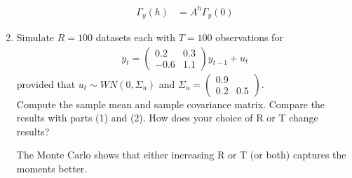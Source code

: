 \documentclass[a4paper]{scrartcl}
\begin{document}
\begin{enumerate}
\begin{solution}
\begin{align*}
                      \Gamma_y(h) & = A^h \Gamma_y(0)
                  \end{align*}
              \end{solution}
        \item Simulate $R=100$ datasets each with $T=100$ observations for
              \begin{align*}
                  y_t = \begin{pmatrix}0.2 &0.3 \\-0.6 & 1.1 \end{pmatrix} y_{t-1}  + u_t
              \end{align*}
              provided that $u_t \sim WN(0,\Sigma_u)$ and $\Sigma_u = \begin{pmatrix}0.9 &  \\ 0.2 & 0.5 \end{pmatrix}$. \\Compute the sample mean and sample covariance matrix. Compare the results with parts (1) and (2). How does your choice of R or T change results?
              \begin{solution}
                  
                  The Monte Carlo shows that either increasing R or T (or both) captures the moments better.
              \end{solution}
    \end{enumerate}
    \newpage
    
\end{document}
